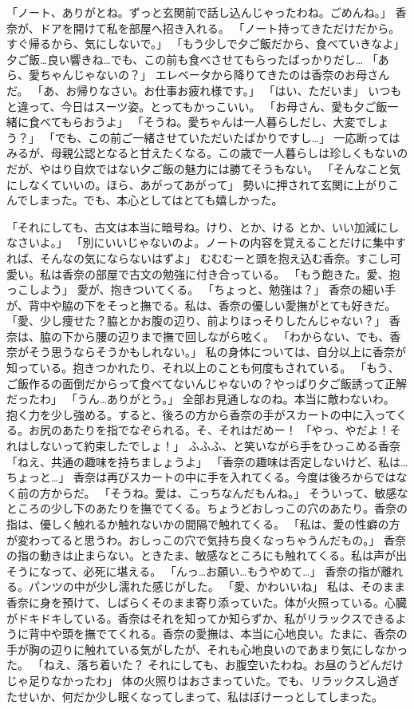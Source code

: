 「ノート、ありがとね。ずっと玄関前で話し込んじゃったわね。ごめんね。」
香奈が、ドアを開けて私を部屋へ招き入れる。
「ノート持ってきただけだから。すぐ帰るから、気にしないで。」
「もう少しで夕ご飯だから、食べていきなよ」
夕ご飯…良い響きね…でも、この前も食べさせてもらったばっかりだし…
「あら、愛ちゃんじゃないの？」
エレベータから降りてきたのは香奈のお母さんだ。
「あ、お帰りなさい。お仕事お疲れ様です。」
「はい、ただいま」
いつもと違って、今日はスーツ姿。とってもかっこいい。
「お母さん、愛も夕ご飯一緒に食べてもらおうよ」
「そうね。愛ちゃんは一人暮らしだし、大変でしょう？」
「でも、この前ご一緒させていただいたばかりですし…」
一応断ってはみるが、母親公認となると甘えたくなる。この歳で一人暮らしは珍しくもないのだが、やはり自炊ではない夕ご飯の魅力には勝てそうもない。
「そんなこと気にしなくていいの。ほら、あがってあがって」
勢いに押されて玄関に上がりこんでしまった。でも、本心としてはとても嬉しかった。

「それにしても、古文は本当に暗号ね。けり、とか、ける とか、いい加減にしなさいよ。」
「別にいいじゃないのよ。ノートの内容を覚えることだけに集中すれば、そんなの気にならないはずよ」
むむむーと頭を抱え込む香奈。すこし可愛い。私は香奈の部屋で古文の勉強に付き合っている。
「もう飽きた。愛、抱っこしよう」
愛が、抱きついてくる。
「ちょっと、勉強は？」
香奈の細い手が、背中や脇の下をそっと撫でる。私は、香奈の優しい愛撫がとても好きだ。
「愛、少し痩せた？脇とかお腹の辺り、前よりほっそりしたんじゃない？」
香奈は、脇の下から腰の辺りまで撫で回しながら呟く。
「わからない、でも、香奈がそう思うならそうかもしれない。」
私の身体については、自分以上に香奈が知っている。抱きつかれたり、それ以上のことも何度もされている。
「もう、ご飯作るの面倒だからって食べてないんじゃないの？やっぱり夕ご飯誘って正解だったわ」
「うん…ありがとう。」
全部お見通しなのね。本当に敵わないわ。
抱く力を少し強める。すると、後ろの方から香奈の手がスカートの中に入ってくる。お尻のあたりを指でなぞられる。そ、それはだめー！
「やっ、やだよ！それはしないって約束したでしょ！」
ふふふ、と笑いながら手をひっこめる香奈
「ねえ、共通の趣味を持ちましょうよ」
「香奈の趣味は否定しないけど、私は…ちょっと…」
香奈は再びスカートの中に手を入れてくる。今度は後ろからではなく前の方からだ。
「そうね。愛は、こっちなんだもんね。」
そういって、敏感なところの少し下のあたりを撫でてくる。ちょうどおしっこの穴のあたり。香奈の指は、優しく触れるか触れないかの間隔で触れてくる。
「私は、愛の性癖の方が変わってると思うわ。おしっこの穴で気持ち良くなっちゃうんだもの。」
香奈の指の動きは止まらない。ときたま、敏感なところにも触れてくる。私は声が出そうになって、必死に堪える。
「んっ…お願い…もうやめて…」
香奈の指が離れる。パンツの中が少し濡れた感じがした。
「愛、かわいいね」
私は、そのまま香奈に身を預けて、しばらくそのまま寄り添っていた。体が火照っている。心臓がドキドキしている。香奈はそれを知ってか知らずか、私がリラックスできるように背中や頭を撫でてくれる。香奈の愛撫は、本当に心地良い。たまに、香奈の手が胸の辺りに触れている気がしたが、それも心地良いのであまり気にしなかった。
「ねえ、落ち着いた？ それにしても、お腹空いたわね。お昼のうどんだけじゃ足りなかったわ」
体の火照りはおさまっていた。でも、リラックスし過ぎたせいか、何だか少し眠くなってしまって、私はぼけーっとしてしまった。



